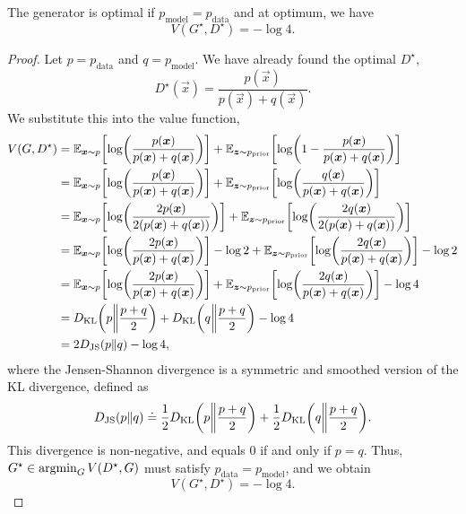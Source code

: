\begin{theorem}
    \label{thm:generator-optimality}
    The generator is optimal if $p_{\mathrm{model}} = p_{\mathrm{data}}$ and at optimum, we have \[
        V(G^\star, D^\star) = -\log 4.
    \]
\end{theorem}

\begin{proof}
    Let $p = p_{\mathrm{data}}$ and $q = p_{\mathrm{model}}$. We have already found the optimal $D^\star$, \[
        D^\star(\vec{x}) = \frac{p(\vec{x})}{p(\vec{x}) + q(\vec{x})}.
    \]
    We substitute this into the value function,
    \begin{align*}
        V(G, D^\star) & = \E_{\vec{x} \sim p} \lft[ \log \lft( \frac{p(\vec{x})}{p(\vec{x}) + q(\vec{x})} \rgt) \rgt] + \E_{\vec{z} \sim p_{\mathrm{prior}}} \lft[ \log \lft( 1 - \frac{p(\vec{x})}{p(\vec{x}) + q(\vec{x})} \rgt) \rgt]                   \\
                      & = \E_{\vec{x} \sim p} \lft[ \log \lft( \frac{p(\vec{x})}{p(\vec{x}) + q(\vec{x})} \rgt) \rgt] + \E_{\vec{z} \sim p_{\mathrm{prior}}} \lft[ \log \lft( \frac{q(\vec{x})}{p(\vec{x}) + q(\vec{x})} \rgt) \rgt]                       \\
                      & = \E_{\vec{x} \sim p} \lft[ \log \lft( \frac{2 p(\vec{x})}{2 (p(\vec{x}) + q(\vec{x}))} \rgt) \rgt] + \E_{\vec{z} \sim p_{\mathrm{prior}}} \lft[ \log \lft( \frac{2 q(\vec{x})}{2 (p(\vec{x}) + q(\vec{x}))} \rgt) \rgt]           \\
                      & = \E_{\vec{x} \sim p} \lft[ \log \lft( \frac{2 p(\vec{x})}{p(\vec{x}) + q(\vec{x})} \rgt) \rgt] - \log 2 + \E_{\vec{z} \sim p_{\mathrm{prior}}} \lft[ \log \lft( \frac{2 q(\vec{x})}{p(\vec{x}) + q(\vec{x})} \rgt) \rgt] - \log 2 \\
                      & = \E_{\vec{x} \sim p} \lft[ \log \lft( \frac{2 p(\vec{x})}{p(\vec{x}) + q(\vec{x})} \rgt) \rgt] + \E_{\vec{z} \sim p_{\mathrm{prior}}} \lft[ \log \lft( \frac{2 q(\vec{x})}{p(\vec{x}) + q(\vec{x})} \rgt) \rgt] - \log 4          \\
                      & = D_{\mathrm{KL}} \lft( p \middle\lVert \frac{p + q}{2} \rgt) + D_{\mathrm{KL}} \lft( q \middle\lVert \frac{p + q}{2} \rgt) - \log 4                                                                                               \\
                      & = 2 D_{\mathrm{JS}}(p \lVert q) - \log 4,
    \end{align*}
    where the Jensen-Shannon divergence is a symmetric and smoothed version of the KL divergence, defined as \[
        D_{\mathrm{JS}}(p \lVert q) \doteq \frac{1}{2} D_{\mathrm{KL}}\lft(p \middle\lVert \frac{p + q}{2} \rgt) + \frac{1}{2} D_{\mathrm{KL}}\lft( q \middle\lVert \frac{p + q}{2} \rgt).
    \]
    This divergence is non-negative, and equals 0 if and only if $p = q$. Thus, $G^\star \in \operatorname*{argmin}_G
        V(D^\star, G)$ must satisfy $p_{\mathrm{data}} = p_{\mathrm{model}}$, and we obtain \[
        V(G^\star, D^\star) = - \log 4.
    \]
\end{proof}

